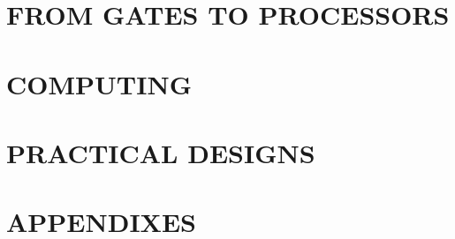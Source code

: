 \documentclass[11pt]{book}
\begin{document}
\part{FROM GATES TO PROCESSORS}





\part{COMPUTING}




\part{PRACTICAL DESIGNS}











%

\clearpage
{}
\part*{APPENDIXES}
\appendix



%

%

%


\clearpage

%
 


\clearpage
\printindex
\end{document}
